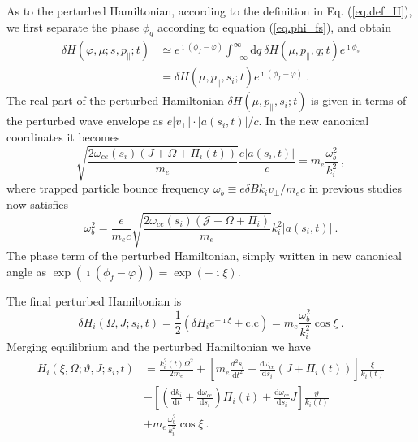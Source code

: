 As to the perturbed Hamiltonian, according to the definition in Eq. (\ref{eq.def_H}), we first separate the phase $\phi_q$ according to equation (\ref{eq.phi_fs}), and obtain
\begin{equation}\label{eq.kernel_H}
    \begin{aligned}
        \delta H(\varphi,\mu;s,p_\|;t) & \simeq e^{\imath\left(\phi_{f}-\varphi\right)} \int_{-\infty}^{\infty} \mathrm{d} q~ \delta H\left(\mu, p_\|, q ; t\right)  e^{\imath \phi_{s}} \\
        & = \delta H\left(\mu, p_\|, s_i; t\right)e^{\imath\left(\phi_{f}-\varphi\right)}~.
    \end{aligned}
\end{equation}
The real part of the perturbed Hamiltonian $\delta H\left(\mu, p_\|, s_i; t\right)$ is given in terms of the perturbed wave envelope as $e |v_{\perp}|\cdot|a\left(s_{i}, t\right)|/c$.
In the new canonical coordinates it becomes
\begin{equation}
    \sqrt{\frac{2\omega_{c e}\left(s_{i}\right)\left(J+\Omega+\Pi_{i}(t)\right)}{m_e}} \frac{e |a\left(s_{i}, t\right)|}{c} = m_e \frac{\omega_b^2}{k_i^2}~,
\end{equation}
where trapped particle bounce frequency $\omega_b \equiv e \delta B  k_i v_\perp / m_e c$ in previous studies \cite{omura_theory_2008,sudan_theory_1971,tao_theoretical_2020} now satisfies
\begin{equation}
    \omega_b^2 = \frac{e}{m_e c} \sqrt{\frac{2\omega_{ce}\left(s_{i}\right)\left(\mathcal{J}+\Omega+\Pi_{i}\right)}{m_e}} k_{i}^2 |a(s_{i}, t)|~.
\end{equation}
The phase term of the perturbed Hamiltonian, simply written in new canonical angle as $\exp({\imath\left(\phi_{f}-\varphi\right)}) = \exp{(- \imath \xi)}$. 

The final perturbed Hamiltonian is 
\begin{equation}
        \delta H_i\left(\Omega, J; s_{i}, t\right) = \frac{1}{2}\left(\delta H_i e^{-\imath \xi}+ \mathrm{c.c}\right) = m_e \frac{\omega_b^2}{k_i^2} \cos\xi~.
\end{equation}
Merging equilibrium and the perturbed Hamiltonian we have
\begin{equation}\label{eq.H_all_0}
    \begin{aligned}
        H_i\left(\xi, \Omega;\vartheta, J; s_{i}, t\right) &= \frac{k_{i}^{2}(t) \Omega^{2}}{2 m_{e}}+\left[m_{e} \frac{d^{2} s_{i}}{\mathrm{d}t^{2}}+\frac{\mathrm{d}\omega_{c e}}{\mathrm{d}s_{i}}\left(J+\Pi_{i}(t)\right)\right] \frac{\xi}{k_{i}(t)} 
        \\
        &-\left[\left(\frac{\mathrm{d}k_{i}}{\mathrm{d}t}+\frac{\mathrm{d}\omega_{c e}}{\mathrm{d}s_{i}}\right) \Pi_{i}(t)+\frac{\mathrm{d}\omega_{c e}}{\mathrm{d}s_{i}} J\right] \frac{\vartheta}{k_{i}(t)} 
        \\
        & + m_e \frac{\omega_b^2}{k_i^2} \cos\xi~.
    \end{aligned}
\end{equation}


